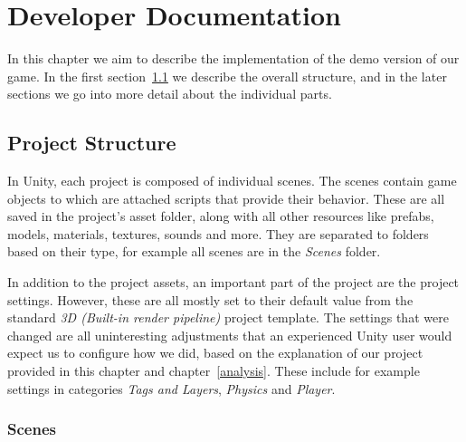 \chapter{Developer Documentation}

In this chapter we aim to describe the implementation of the demo version of our game.
In the first section~\ref{sec:docs-proj} we describe the overall structure, and in the later sections we go into more detail about the individual parts.

\section{Project Structure}\label{sec:docs-proj}

In Unity, each project is composed of individual scenes.
The scenes contain game objects to which are attached scripts that provide their behavior.
These are all saved in the project's asset folder, along with all other resources like prefabs, models, materials, textures, sounds and more.
They are separated to folders based on their type, for example all scenes are in the \emph{Scenes} folder.

In addition to the project assets, an important part of the project are the project settings.
However, these are all mostly set to their default value from the standard \emph{3D (Built-in render pipeline)} project template.
The settings that were changed are all uninteresting adjustments that an experienced Unity user would expect us to configure how we did, based on the explanation of our project provided in this chapter and chapter~\ref{analysis}.
These include for example settings in categories \emph{Tags and Layers}, \emph{Physics} and \emph{Player}.

\subsection{Scenes}

